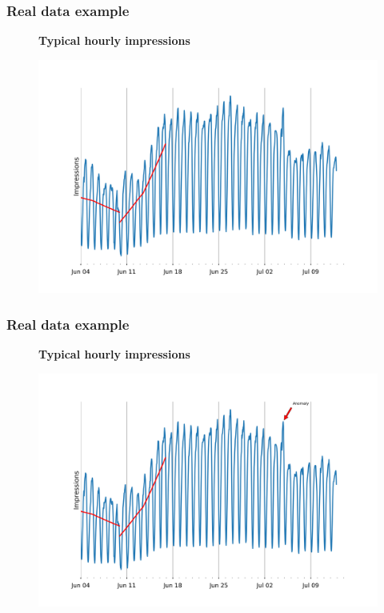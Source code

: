 \documentclass[intlimits, 9pt, unicode]{beamer}
\begin{document}
\begin{frame}
\frametitle{Real data example}
\begin{figure}
\textbf{Typical hourly impressions}\par\medskip
\includegraphics[scale=0.30]{images/examples_month_2}
\end{figure}
\end{frame}

\begin{frame}
\frametitle{Real data example}
\begin{figure}
\textbf{Typical hourly impressions}\par\medskip
\includegraphics[scale=0.30]{images/examples_month_3}
\end{figure}
\end{frame}
\end{document}
